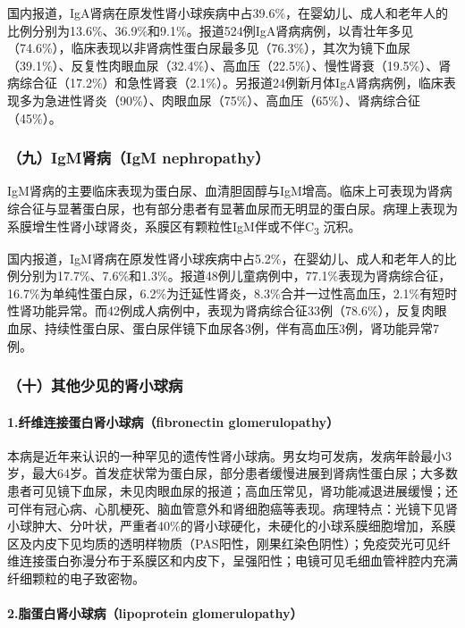 国内报道，IgA肾病在原发性肾小球疾病中占39.6\%，在婴幼儿、成人和老年人的比例分别为13.6\%、36.9\%和9.1\%。报道524例IgA肾病病例，以青壮年多见（74.6\%），临床表现以非肾病性蛋白尿最多见（76.3\%），其次为镜下血尿（39.1\%）、反复性肉眼血尿（32.4\%）、高血压（22.5\%）、慢性肾衰（19.5\%）、肾病综合征（17.2\%）和急性肾衰（2.1\%）。另报道24例新月体IgA肾病病例，临床表现多为急进性肾炎（90\%）、肉眼血尿（75\%）、高血压（65\%）、肾病综合征（45\%）。

\subsubsection{（九）IgM肾病（IgM nephropathy）}

IgM肾病的主要临床表现为蛋白尿、血清胆固醇与IgM增高。临床上可表现为肾病综合征与显著蛋白尿，也有部分患者有显著血尿而无明显的蛋白尿。病理上表现为系膜增生性肾小球肾炎，系膜区有颗粒性IgM伴或不伴C\textsubscript{3}
沉积。

国内报道，IgM肾病在原发性肾小球疾病中占5.2\%，在婴幼儿、成人和老年人的比例分别为17.7\%、7.6\%和1.3\%。报道48例儿童病例中，77.1\%表现为肾病综合征，16.7\%为单纯性蛋白尿，6.2\%为迁延性肾炎，8.3\%合并一过性高血压，2.1\%有短时性肾功能异常。而42例成人病例中，表现为肾病综合征33例（78.6\%），反复肉眼血尿、持续性蛋白尿、蛋白尿伴镜下血尿各3例，伴有高血压3例，肾功能异常7例。

\subsubsection{（十）其他少见的肾小球病}

\paragraph{1.纤维连接蛋白肾小球病（fibronectin glomerulopathy）}

本病是近年来认识的一种罕见的遗传性肾小球病。男女均可发病，发病年龄最小3岁，最大64岁。首发症状常为蛋白尿，部分患者缓慢进展到肾病性蛋白尿；大多数患者可见镜下血尿，未见肉眼血尿的报道；高血压常见，肾功能减退进展缓慢；还可伴有冠心病、心肌梗死、脑血管意外和肾细胞癌等表现。病理特点：光镜下见肾小球肿大、分叶状，严重者40\%的肾小球硬化，未硬化的小球系膜细胞增加，系膜区及内皮下见均质的透明样物质（PAS阳性，刚果红染色阴性）；免疫荧光可见纤维连接蛋白弥漫分布于系膜区和内皮下，呈强阳性；电镜可见毛细血管袢腔内充满纤细颗粒的电子致密物。

\paragraph{2.脂蛋白肾小球病（lipoprotein glomerulopathy）}

